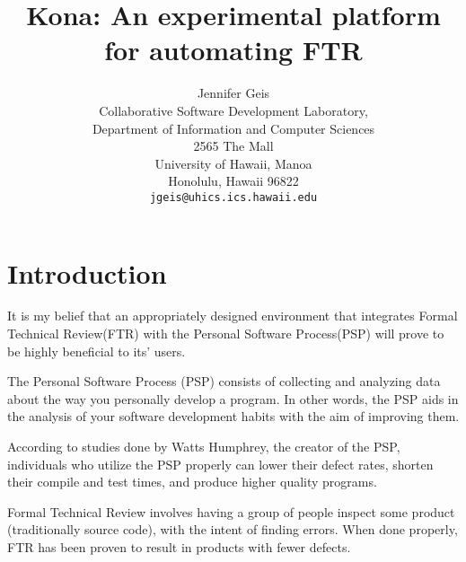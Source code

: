 






\title{Kona: An experimental platform for automating FTR} \author{Jennifer
  Geis\\ Collaborative Software Development Laboratory,\\ Department of
  Information and Computer Sciences\\ 2565 The Mall\\ University of Hawaii,
  Manoa\\ Honolulu, Hawaii 96822\\ {\tt jgeis@uhics.ics.hawaii.edu}}
\maketitle

\tableofcontents

\chapter{Introduction}
It is my belief that an appropriately designed environment that integrates
Formal Technical Review(FTR) with the Personal Software Process(PSP) will
prove to be highly beneficial to its' users.

The Personal Software Process (PSP) consists of collecting and analyzing
data about the way you personally develop a program.  In other words, the
PSP aids in the analysis of your software development habits with the aim
of improving them.

According to studies done by Watts Humphrey, the creator of the PSP,
individuals who utilize the PSP properly can lower their defect rates,
shorten their compile and test times, and produce higher quality programs.

Formal Technical Review involves having a group of people inspect some
product (traditionally source code), with the intent of finding errors.
When done properly, FTR has been proven to result in products with fewer
defects.

